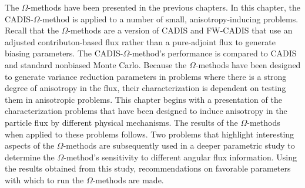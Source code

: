 The $\Omega$-methods have been presented in the previous chapters.
In this chapter, the CADIS-$\Omega$-method is applied to a
number of small, anisotropy-inducing problems. Recall that the $\Omega$-methods
are a version of CADIS and FW-CADIS that use an adjusted contributon-based flux
rather than a pure-adjoint flux to generate biasing parameters.
The CADIS-$\Omega$-method's performance
is compared to CADIS and standard nonbiased Monte Carlo.
Because the $\Omega$-methods have been designed to generate variance reduction
parameters in problems
where there is a strong degree of anisotropy in the flux, their
characterization is dependent on testing them in anisotropic
problems.
This chapter begins with a presentation of the characterization problems
that have been designed to induce anisotropy in the particle flux by
different physical mechanisms. The results of the $\Omega$-methods when
applied to these problems follows. Two problems that highlight interesting
aspects of the $\Omega$-methods are subsequently used in a deeper parametric study to
determine the $\Omega$-method's sensitivity to different angular flux
information. Using the results obtained from this study,
recommendations on favorable
parameters with which to run the $\Omega$-methods are made. \\

